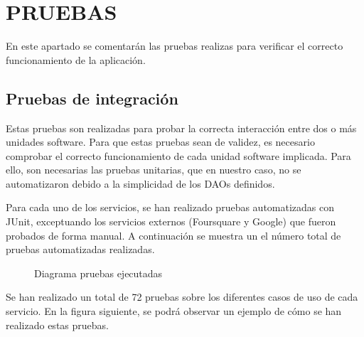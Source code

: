 \chapter[Pruebas]{
  \label{chp:pruebas}
  PRUEBAS
}
\thispagestyle{numberingStyle}
\pagestyle{numberingStyle}

En este apartado se comentarán las pruebas realizas para verificar el correcto funcionamiento de la aplicación.



\section{Pruebas de integración}
Estas pruebas son realizadas para probar la correcta interacción entre dos o más unidades software. Para que estas pruebas sean de validez, es necesario comprobar el correcto funcionamiento de cada unidad software implicada. Para ello, son necesarias las pruebas unitarias, que en nuestro caso, no se automatizaron debido a la simplicidad de los DAOs definidos.

Para cada uno de los servicios, se han realizado pruebas automatizadas con JUnit, exceptuando los servicios externos (Foursquare y Google) que fueron probados de forma manual. A continuación se muestra un el número total de pruebas automatizadas realizadas.

\begin{figure}[H]
\centering
{}
\caption{Diagrama pruebas ejecutadas}
\end{figure}

Se han realizado un total de 72 pruebas sobre los diferentes casos de uso de cada servicio. En la figura siguiente, se podrá observar un ejemplo de cómo se han realizado estas pruebas.

